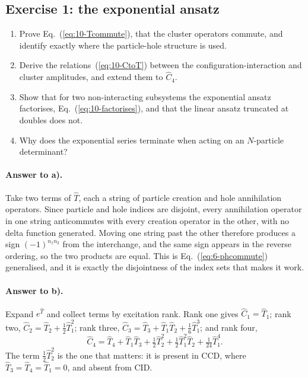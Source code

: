 \subsection*{Exercise 1: the exponential ansatz}
\label{ex:10-ansatz}

\begin{enumerate}
  \item[a)] Prove Eq.~(\ref{eq:10-Tcommute}), that the cluster operators
  commute, and identify exactly where the particle-hole structure is used.
  \item[b)] Derive the relations~(\ref{eq:10-CtoT}) between the
  configuration-interaction and cluster amplitudes, and extend them to
  $\hat{C}_4$.
  \item[c)] Show that for two non-interacting subsystems the exponential
  ansatz factorises, Eq.~(\ref{eq:10-factorises}), and that the linear ansatz
  truncated at doubles does not.
  \item[d)] Why does the exponential series terminate when acting on an
  $N$-particle determinant?
\end{enumerate}

\paragraph{Answer to a).}
Take two terms of $\hat{T}$, each a string of particle creation and hole
annihilation operators.  Since particle and hole indices are disjoint, every
annihilation operator in one string anticommutes with every creation operator
in the other, with no delta function generated.  Moving one string past the
other therefore produces a sign $(-1)^{n_1n_2}$ from the interchange, and the
same sign appears in the reverse ordering, so the two products are equal.
This is Eq.~(\ref{eq:6-phcommute}) generalised, and it is exactly the
disjointness of the index sets that makes it work.

\paragraph{Answer to b).}
Expand $e^{\hat{T}}$ and collect terms by excitation rank.  Rank one gives
$\hat{C}_1=\hat{T}_1$; rank two, $\hat{C}_2=\hat{T}_2+\tfrac12\hat{T}_1^2$;
rank three, $\hat{C}_3=\hat{T}_3+\hat{T}_1\hat{T}_2+\tfrac16\hat{T}_1^3$; and
rank four,
\begin{equation}
  \hat{C}_4 = \hat{T}_4 + \hat{T}_1\hat{T}_3
    + \tfrac12\hat{T}_2^2 + \tfrac12\hat{T}_1^2\hat{T}_2
    + \tfrac{1}{24}\hat{T}_1^4 .
  \label{eq:10-exb1}
\end{equation}
The term $\tfrac12\hat{T}_2^2$ is the one that matters: it is present in CCD,
where $\hat{T}_3=\hat{T}_4=\hat{T}_1=0$, and absent from CID.

